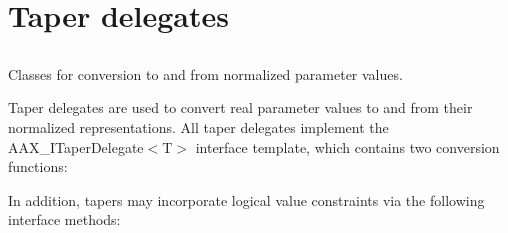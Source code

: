 \hypertarget{a00815}{}\section{Taper delegates}
\label{a00815}


\subsection{ }
Classes for conversion to and from normalized parameter values. 

Taper delegates are used to convert real parameter values to and from their normalized representations. All taper delegates implement the A\+A\+X\+\_\+\+I\+Taper\+Delegate$<$\+T$>$ interface template, which contains two conversion functions\+:


\begin{DoxyCode}{0}
\end{DoxyCode}


In addition, tapers may incorporate logical value constraints via the following interface methods\+:


\begin{DoxyCode}{0}
\end{DoxyCode}



